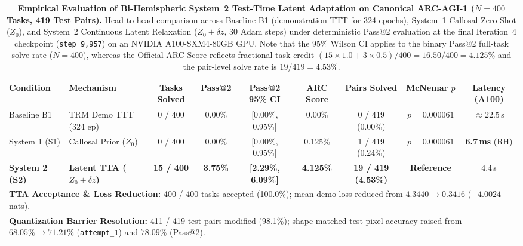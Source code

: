 \documentclass[11pt,a4paper]{article}
\theoremstyle{plain}
\theoremstyle{definition}
\theoremstyle{remark}
\begin{document}
\begin{table}[t]
\centering
\small
\caption{\textbf{Empirical Evaluation of Bi-Hemispheric System~2 Test-Time Latent Adaptation on Canonical ARC-AGI-1 ($N = 400$ Tasks, 419 Test Pairs).} 
Head-to-head comparison across Baseline B1 (demonstration TTT for 324 epochs), System~1 Callosal Zero-Shot ($Z_0$), and System~2 Continuous Latent Relaxation ($Z_0 + \delta z$, 30 Adam steps) under deterministic Pass@2 evaluation at the final Iteration~4 checkpoint (\texttt{step 9,957}) on an NVIDIA A100-SXM4-80GB GPU. Note that the $95\%$ Wilson CI applies to the binary Pass@2 full-task solve rate ($N=400$), whereas the Official ARC Score reflects fractional task credit $(15 \times 1.0 + 3 \times 0.5)/400 = 16.50/400 = 4.125\%$ and the pair-level solve rate is $19 / 419 = 4.53\%$.}
\label{tab:p3_rq3_results}
\begin{tabular}{llccccccc}
\toprule
\textbf{Condition} & \textbf{Mechanism} & \textbf{Tasks Solved} & \textbf{Pass@2} & \textbf{Pass@2 95\% CI} & \textbf{ARC Score} & \textbf{Pairs Solved} & \textbf{McNemar $p$} & \textbf{Latency (A100)} \\
\midrule
Baseline B1 & TRM Demo TTT (324 ep) & 0 / 400 & 0.00\% & [0.00\%, 0.95\%] & 0.00\% & 0 / 419 (0.00\%) & $p = 0.000061$ & $\approx 22.5$\,s \\
System 1 (S1) & Callosal Prior ($Z_0$) & 0 / 400 & 0.00\% & [0.00\%, 0.95\%] & 0.125\% & 1 / 419 (0.24\%) & $p = 0.000061$ & \textbf{6.7\,ms} (RH) \\
\textbf{System 2 (S2)} & \textbf{Latent TTA ($Z_0 + \delta z$)} & \textbf{15 / 400} & \textbf{3.75\%} & \textbf{[2.29\%, 6.09\%]} & \textbf{4.125\%} & \textbf{19 / 419 (4.53\%)} & \textbf{Reference} & 4.4\,s \\
\midrule
\multicolumn{9}{l}{\textbf{TTA Acceptance \& Loss Reduction:} 400 / 400 tasks accepted (100.0\%); mean demo loss reduced from $4.3440 \to 0.3416$ ($-4.0024$\,nats).} \\
\multicolumn{9}{l}{\textbf{Quantization Barrier Resolution:} 411 / 419 test pairs modified (98.1\%); shape-matched test pixel accuracy raised from $68.05\% \to 71.21\%$ (\texttt{attempt\_1}) and $78.09\%$ (Pass@2).} \\
\bottomrule
\end{tabular}
\end{table}
\end{document}
